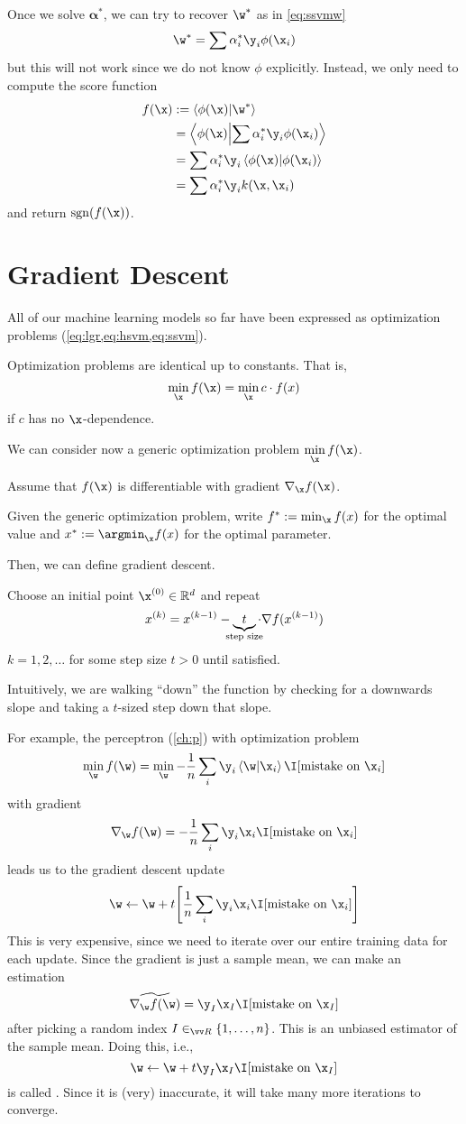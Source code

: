 \documentclass[class=cs480,notes,tikz]{agony}
\begin{document}
Once we solve $\symbf\alpha^*$, we can try to recover $\w^*$ as in \cref{eq:ssvmw}
\[ \w^* = \sum \alpha_i^*\y_i \phi(\x_i) \]
but this will not work since we do not know $\phi$ explicitly.
Instead, we only need to compute the score function
\begin{align*}
  f(\x) & := \ip{\phi(\x)}{\w^*}                          \\
        & = \ip{\phi(\x)}{\sum \alpha_i^*\y_i \phi(\x_i)} \\
        & = \sum \alpha_i^*\y_i \ip{\phi(\x)}{\phi(\x_i)} \\
        & = \sum \alpha_i^*\y_i k(\x,\x_i)
\end{align*}
and return $\sgn(f(\x))$.

\section{Gradient Descent}\label{ch:gd}

All of our machine learning models so far have been expressed as optimization problems
(\cref{eq:lgr,eq:hsvm,eq:ssvm}).
\begin{remark}
  Optimization problems are identical up to constants.
  That is,
  \[ \min_{\x} f(\x) = \min_{\x} c\cdot f(x) \]
  if $c$ has no $\x$-dependence.
\end{remark}
We can consider now a generic optimization problem $\min\limits_{\x} f(\x)$.

Assume that $f(\x)$ is differentiable with gradient $\nabla_{\x} f(\x)$.
\begin{notation}
  Given the generic optimization problem,
  write $f^* := \min_{\x} f(x)$ for the optimal value
  and $x^* := \argmin_{\x} f(x)$ for the optimal parameter.
\end{notation}
Then, we can define gradient descent.
\begin{definition}
  Choose an initial point $\x^{(0)} \in \R^d$ and repeat
  \[ x^{(k)} = x^{(k-1)} - \underbrace{t}_{\mathclap{\text{step size}}} \cdot \nabla f(x^{(k-1)}) \]
  $k = 1,2,\dotsc$ for some step size $t > 0$ until satisfied.
\end{definition}
Intuitively, we are walking ``down'' the function by checking
for a downwards slope and taking a $t$-sized step down that slope.

For example, the perceptron (\cref{ch:p}) with optimization problem
\[
  \min_{\w}f(\w) = \min_{\w} -\frac1n\sum_i\y_i\ip{\w}{\x_i}\I[\text{mistake on $\x_i$}]
\]
with gradient
\[
  \nabla_{\w} f(\w) = -\frac1n\sum_i\y_i\x_i\I[\text{mistake on $\x_i$}]
\]
leads us to the gradient descent update
\[
  \w \gets \w + t\qty[\frac1n\sum_i\y_i\x_i\I[\text{mistake on $\x_i$}]]
\]
This is very expensive, since we need to iterate over our entire training data
for each update.
Since the gradient is just a sample mean, we can make an estimation
\[
  \widetilde{\nabla_{\w}f(\w)} = \y_I\x_I\I[\text{mistake on $\x_I$}]
\]
after picking a random index $I \in_{\vv R} \{1,\dotsc,n\}$.
This is an unbiased estimator of the sample mean.
Doing this, i.e.,
\[ \w \gets \w + t\y_I\x_I\I[\text{mistake on $\x_I$}] \]
is called .
Since it is (very) inaccurate, it will take many more iterations to converge.
\end{document}
